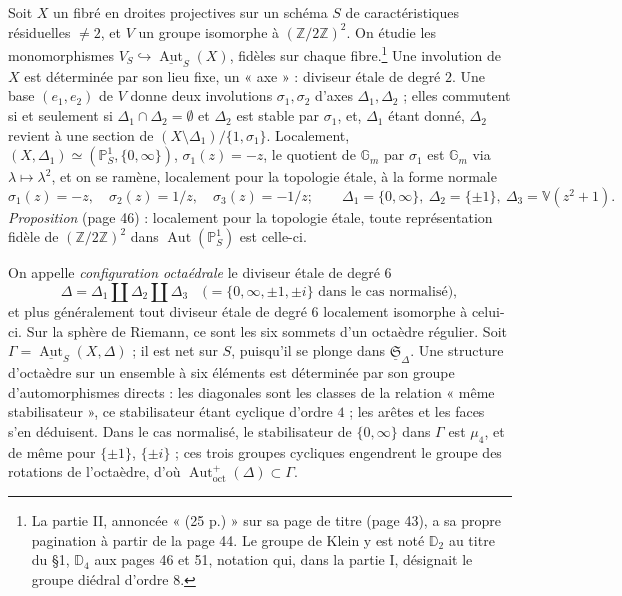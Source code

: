 \documentclass[11pt,a4paper]{article}
\begin{document}
Soit $X$ un fibré en droites projectives sur un schéma $S$ de caractéristiques
résiduelles $\neq 2$, et $V$ un groupe isomorphe à $(\mathbb{Z}/2\mathbb{Z})^2$.
On étudie les monomorphismes $V_S \hookrightarrow
\underline{\operatorname{Aut}}_S(X)$, fidèles sur chaque fibre.\footnote{La
partie II, annoncée « (25 p.) » sur sa page de titre (page 43), a sa propre
pagination à partir de la page 44. Le groupe de Klein y est noté
$\mathbb{D}_2$ au titre du §1, $\mathbb{D}_4$ aux pages 46 et 51, notation qui,
dans la partie I, désignait le groupe diédral d'ordre $8$.} Une involution de
$X$ est déterminée par son lieu fixe, un « axe » : diviseur étale de degré $2$.
Une base $(e_1, e_2)$ de $V$ donne deux involutions $\sigma_1, \sigma_2$ d'axes
$\Delta_1, \Delta_2$ ; elles commutent si et seulement si $\Delta_1 \cap
\Delta_2 = \emptyset$ et $\Delta_2$ est stable par $\sigma_1$, et, $\Delta_1$
étant donné, $\Delta_2$ revient à une section de $(X \setminus \Delta_1) /
\{1, \sigma_1\}$. Localement, $(X, \Delta_1) \simeq (\mathbb{P}^1_S, \{0,
\infty\})$, $\sigma_1(z) = -z$, le quotient de $\mathbb{G}_m$ par $\sigma_1$ est
$\mathbb{G}_m$ via $\lambda \mapsto \lambda^2$, et on se ramène, localement pour
la topologie étale, à la forme normale
\[
\sigma_1(z) = -z, \quad \sigma_2(z) = 1/z, \quad \sigma_3(z) = -1/z ; \qquad
\Delta_1 = \{0, \infty\}, \ \Delta_2 = \{\pm 1\}, \ \Delta_3 = \mathbb{V}(z^2 + 1).
\]
\emph{Proposition} (page 46) : localement pour la topologie étale, toute
représentation fidèle de $(\mathbb{Z}/2\mathbb{Z})^2$ dans
$\operatorname{Aut}(\mathbb{P}^1_S)$ est celle-ci.

On appelle \emph{configuration octaédrale} le diviseur étale de degré $6$
\[
\Delta = \Delta_1 \amalg \Delta_2 \amalg \Delta_3 \quad \bigl( = \{0, \infty,
\pm 1, \pm i\} \text{ dans le cas normalisé} \bigr),
\]
et plus généralement tout diviseur étale de degré $6$ localement isomorphe à
celui-ci. Sur la sphère de Riemann, ce sont les six sommets d'un octaèdre
régulier. Soit $\Gamma = \underline{\operatorname{Aut}}_S(X, \Delta)$ ; il est
net sur $S$, puisqu'il se plonge dans $\underline{\mathfrak{S}}_\Delta$. Une
structure d'octaèdre sur un ensemble à six éléments est déterminée par son
groupe d'automorphismes directs : les diagonales sont les classes de la
relation « même stabilisateur », ce stabilisateur étant cyclique d'ordre $4$ ;
les arêtes et les faces s'en déduisent. Dans le cas normalisé, le stabilisateur
de $\{0, \infty\}$ dans $\Gamma$ est $\mu_4$, et de même pour $\{\pm 1\}$,
$\{\pm i\}$ ; ces trois groupes cycliques engendrent le groupe des rotations de
l'octaèdre, d'où $\operatorname{Aut}^{+}_{\mathrm{oct}}(\Delta) \subset \Gamma$.
\end{document}
